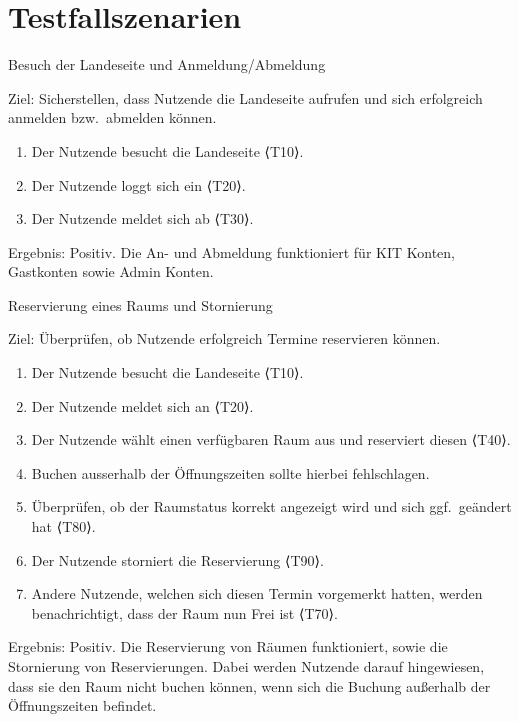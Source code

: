 \newpage

\section{Testfallszenarien}\label{sec:testfallszenarien}
\begin{scenario}{10}{Besuch der Landeseite und Anmeldung/Abmeldung}
    \item[Ziel:] Sicherstellen, dass Nutzende die Landeseite aufrufen und sich erfolgreich anmelden bzw.\ abmelden können.
    \begin{enumerate}
        \item Der Nutzende besucht die Landeseite ⟨T10⟩.
        \item Der Nutzende loggt sich ein ⟨T20⟩.
        \item Der Nutzende meldet sich ab ⟨T30⟩.
    \end{enumerate}
    \item[Ergebnis:] Positiv.
    Die An- und Abmeldung funktioniert für KIT Konten, Gastkonten sowie Admin Konten.
\end{scenario}

\begin{scenario}{20}{Reservierung eines Raums und Stornierung}
    \item[Ziel:] Überprüfen, ob Nutzende erfolgreich Termine reservieren können.
    \begin{enumerate}
        \item Der Nutzende besucht die Landeseite ⟨T10⟩.
        \item Der Nutzende meldet sich an ⟨T20⟩.
        \item Der Nutzende wählt einen verfügbaren Raum aus und reserviert diesen ⟨T40⟩.
        \item Buchen ausserhalb der Öffnungszeiten sollte hierbei fehlschlagen.
        \item Überprüfen, ob der Raumstatus korrekt angezeigt wird und sich ggf.\ geändert hat ⟨T80⟩.
        \item Der Nutzende storniert die Reservierung ⟨T90⟩.
        \item Andere Nutzende, welchen sich diesen Termin vorgemerkt hatten, werden benachrichtigt, dass der Raum nun Frei ist ⟨T70⟩.
    \end{enumerate}
    \item[Ergebnis:] Positiv.
    Die Reservierung von Räumen funktioniert, sowie die Stornierung von Reservierungen.
    Dabei werden Nutzende darauf hingewiesen, dass sie den Raum nicht buchen können, wenn sich die Buchung außerhalb der Öffnungszeiten befindet.
\end{scenario}

